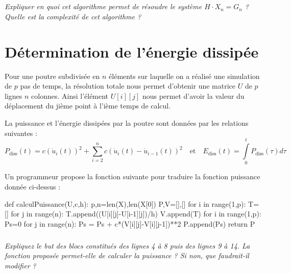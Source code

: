 \documentclass[10pt]{article}
\newif\ifprof
\begin{document}
\fi

\subparagraph{}
\textit{Expliquer en quoi cet algorithme permet de résoudre le système $H\cdot X_n = G_n$ ? Quelle est la complexité de cet algorithme ?}
\ifprof
\begin{corrige}
La matrice étant tridiagonale, la phase d'échelonnage et de remontée sont simplifiées. 
\end{corrige}
\else
\fi


\section{Détermination de l'énergie dissipée}
\ifprof
\else

Pour une poutre subdivisée en $n$ éléments sur laquelle on a réalisé une simulation de $p$ pas de temps, la résolution totale nous permet d'obtenir une matrice $U$ de $p$ lignes $n$ colonnes. Ainsi l'élément $U[i][j]$ nous permet d'avoir la valeur du déplacement du jième point à l'ième temps de calcul.

La puissance et l'énergie dissipées par la poutre sont données par les relations suivantes :
$$
P_{\text{diss}}(t) = c(\dot{u}_i(t))^2 + \sum\limits_{i=2}^n c\left(\dot{u}_i(t) - \dot{u}_{i-1}(t)\right)^2
\quad \text{et} \quad 
E_{\text{diss}}(t) = \int\limits_{0}^t P_{\text{diss}}(\tau) d\tau
$$


Un programmeur propose la fonction suivante pour traduire la fonction puissance donnée ci-dessus :
\begin{py}
\begin{python}
def calculPuissance(U,c,h):
    p,n=len(X),len(X[0])
    P,V=[],[]
    for i in range(1,p):
        T=[]
        for j in range(n):
            T.append((U[i][j]-U[i-1][j])/h)
        V.append(T)
    for i in range(1,p):
        Ps=0
        for j in range(n):
                Ps = Ps + c*(V[i][j]-V[i][j-1])**2
        P.append(Ps)
    return P
\end{python}
\end{py}

\fi

\subparagraph{}
\textit{Expliquez le but des blocs constitués des lignes 4 à 8 puis des lignes 9 à 14. La fonction proposée permet-elle de calculer la puissance ? Si non, que faudrait-il modifier ? }
\ifprof
\begin{corrige}
La puissance devant être calculée à partir de la vitesse, les lignes 4 à 8 permettent de calculer la vitesse par différence de position sur un temps $h$. La vitesse d'un n\oe{}ud $j$ à l'instant $i$ est donc calculée par $\dfrac{U[i][j]-U[i-1][j])}{h}$.

Les lignes 9 à 14 permettent de calculer la puissance, mais ne prennent pas en compte le cas où $i$ =0. Il faut donc que le range varie entre 0 et $p$ et traiter le cas où $p=0$ à l'aide d'un \textsf{if}. 
\end{corrige}
\else
\fi
\end{document}
